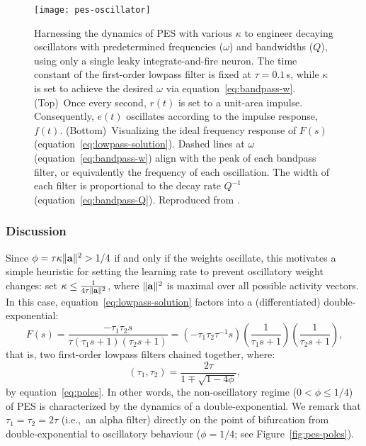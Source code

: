 \begin{figure}
\centering
\texttt{[image: pes-oscillator]}
\caption{ \label{fig:pes-oscillator}
  Harnessing the dynamics of PES with various $\kappa$ to engineer decaying oscillators with predetermined frequencies ($\omega$) and bandwidths ($Q$), using only a single leaky integrate-and-fire neuron.
  The time constant of the first-order lowpass filter is fixed at $\tau = 0.1\,$s, while $\kappa$ is set to achieve the desired $\omega$ via equation~\ref{eq:bandpass-w}.
  (Top)~Once every second, $r(t)$ is set to a unit-area impulse.
  Consequently, $e(t)$ oscillates according to the impulse response, $f(t)$.
  (Bottom)~Visualizing the ideal frequency response of $F(s)$ (equation~\ref{eq:lowpass-solution}).
  Dashed lines at $\omega$ (equation~\ref{eq:bandpass-w}) align with the peak of each bandpass filter, or equivalently the frequency of each oscillation.
  The width of each filter is proportional to the decay rate $Q^{-1}$ (equation~\ref{eq:bandpass-Q}).
  Reproduced from \citet[][Figure~3]{voelker2017c}.
}
\end{figure}

\subsubsection{Discussion}

Since $\phi = \tau \kappa \|\mathbf{a}\|^2 > 1/4$ if and only if the weights oscillate, this motivates a simple heuristic for setting the learning rate to prevent oscillatory weight changes: set $\kappa \le \frac{1}{4 \tau \|\mathbf{a}\|^2}$, where $\|\mathbf{a}\|^2$ is maximal over all possible activity vectors.
In this case, equation~\ref{eq:lowpass-solution} factors into a (differentiated) double-exponential:
\begin{equation*}
F(s) = \frac{-\tau_1 \tau_2 s}{\tau (\tau_1 s + 1)(\tau_2 s + 1)} = \left( - \tau_1 \tau_2 \tau^{-1} s \right) \left( \frac{1}{\tau_1 s + 1}\right) \left(\frac{1}{\tau_2 s + 1}\right) \text{,}
\end{equation*}
that is, two first-order lowpass filters chained together, where:
\begin{equation*}
\left( \tau_1, \tau_2 \right) = \frac{2 \tau}{1 \mp \sqrt{1 - 4 \phi}} \text{,}
\end{equation*}
by equation~\ref{eq:poles}.
In other words, the non-oscillatory regime ($0 < \phi \le 1/4$) of PES is characterized by the dynamics of a double-exponential.
We remark that $\tau_1 = \tau_2 = 2 \tau$ (i.e.,~an alpha filter) directly on the point of bifurcation from double-exponential to oscillatory behaviour ($\phi = 1/4$; see Figure~\ref{fig:pes-poles}).

